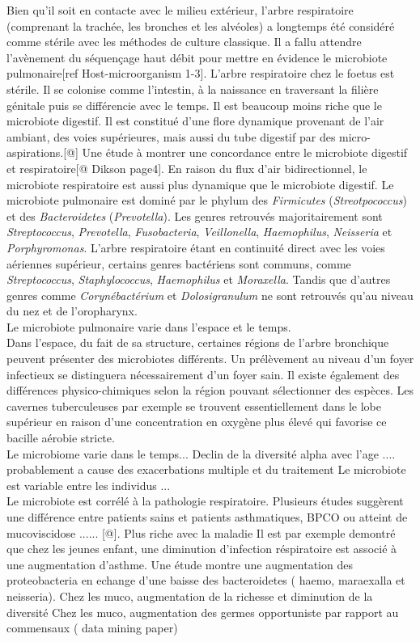 \documentclass[12pt,a4paper]{article}
\begin{document}
Bien qu'il soit en contacte avec le milieu extérieur, l’arbre respiratoire (comprenant la trachée, les bronches et les alvéoles) a longtemps été considéré comme stérile avec les méthodes de culture classique. Il a fallu attendre l’avènement du séquençage haut débit pour mettre en évidence le microbiote pulmonaire[ref Host-microorganism 1-3].
L'arbre respiratoire chez le foetus est stérile. Il se colonise comme l'intestin, à la naissance en traversant la filière génitale puis se différencie avec le temps. Il est beaucoup moins riche que le microbiote digestif.  Il est constitué d’une flore dynamique provenant de l’air ambiant, des voies supérieures,  mais aussi du tube digestif par des micro-aspirations.[@] Une étude à montrer une concordance entre le microbiote digestif et respiratoire[@ Dikson page4].
En raison du flux d'air bidirectionnel, le microbiote respiratoire est aussi plus dynamique que le microbiote digestif.
Le microbiote pulmonaire est dominé par le phylum des \textit{Firmicutes} (\textit{Streotpococcus}) et des \textit{Bacteroidetes} (\textit{Prevotella}). Les genres retrouvés majoritairement sont \textit{Streptococcus}, \textit{Prevotella}, \textit{Fusobacteria}, \textit{Veillonella}, \textit{Haemophilus}, \textit{Neisseria} et \textit{Porphyromonas}.
L’arbre respiratoire étant en continuité direct avec les voies aériennes supérieur, certains genres bactériens sont communs, comme \textit{Streptococcus}, \textit{Staphylococcus}, \textit{Haemophilus} et \textit{Moraxella}. Tandis que d’autres genres comme \textit{Corynébactérium} et \textit{Dolosigranulum} ne sont retrouvés qu’au niveau du nez et de l'oropharynx. \\
Le microbiote pulmonaire varie dans l’espace et le temps. \\
Dans l’espace, du fait de sa structure, certaines régions de l'arbre bronchique peuvent présenter des microbiotes différents. Un prélèvement au niveau d'un foyer infectieux se distinguera nécessairement d'un foyer sain. Il existe également des différences physico-chimiques selon la région pouvant sélectionner des espèces. Les cavernes tuberculeuses par exemple se trouvent essentiellement dans le lobe supérieur en raison d'une concentration en oxygène plus élevé qui favorise ce bacille aérobie stricte. \\
Le microbiome varie dans le temps... 
Declin de la diversité alpha avec l'age .... probablement a cause des exacerbations multiple et du traitement
Le microbiote est variable entre les individus ... \\
Le microbiote est corrélé à la pathologie respiratoire. Plusieurs études suggèrent une différence entre patients sains et patients asthmatiques, BPCO ou atteint de mucoviscidose ...... [@].
Plus riche avec la maladie
Il est par exemple demontré que chez les jeunes enfant, une diminution d'infection réspiratoire est associé à une augmentation d'asthme. Une étude montre une augmentation des proteobacteria en echange d'une baisse des bacteroidetes ( haemo, maraexalla et neisseria).
Chez les muco, augmentation de la richesse et diminution de la diversité 
Chez les muco, augmentation des germes opportuniste par rapport au commensaux ( data mining paper)
\end{document}
